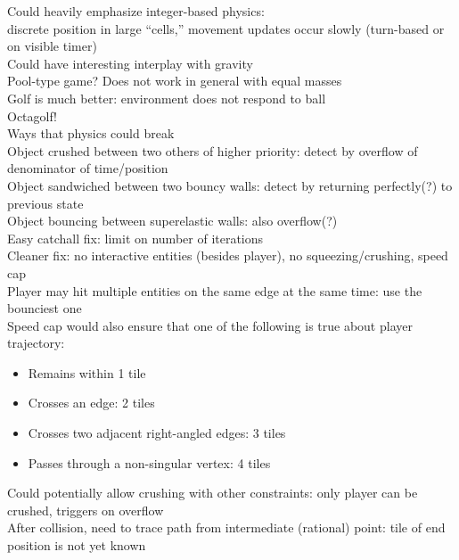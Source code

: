 \documentclass{article}
\begin{document}
Could heavily emphasize integer-based physics: \\
discrete position in large ``cells,''
movement updates occur slowly (turn-based or on visible timer) \\
Could have interesting interplay with gravity \\
Pool-type game? Does not work in general with equal masses \\
Golf is much better: environment does not respond to ball \\
Octagolf! \\

Ways that physics could break \\
Object crushed between two others of higher priority:
detect by overflow of denominator of time/position \\
Object sandwiched between two bouncy walls:
detect by returning perfectly(?) to previous state \\
Object bouncing between superelastic walls: also overflow(?) \\
Easy catchall fix: limit on number of iterations \\
Cleaner fix: no interactive entities (besides player),
no squeezing/crushing, speed cap \\
Player may hit multiple entities on the same edge at the same time:
use the bounciest one \\
Speed cap would also ensure that one of the following is true
about player trajectory:
\begin{itemize}
\item
  Remains within 1 tile
\item
  Crosses an edge: 2 tiles
\item
  Crosses two adjacent right-angled edges: 3 tiles
\item
  Passes through a non-singular vertex: 4 tiles
\end{itemize}
Could potentially allow crushing with other constraints:
only player can be crushed, triggers on overflow \\
After collision, need to trace path from intermediate (rational) point:
tile of end position is not yet known
\end{document}
